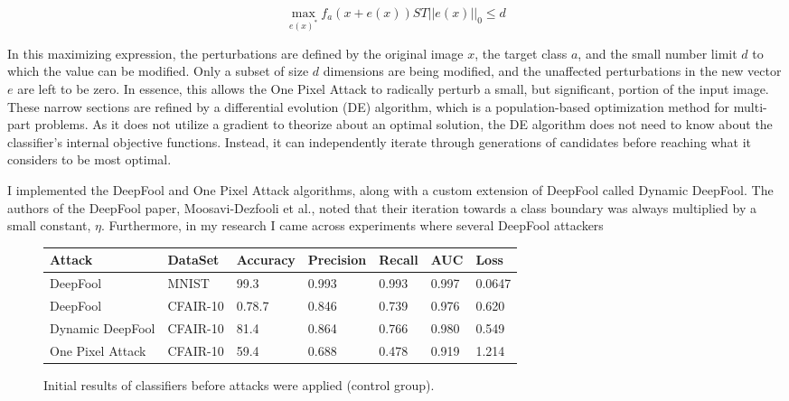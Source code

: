 \documentclass[../article.tex]{subfiles}
\begin{document}
\[\max_{e(x)^*} f_{a}(x + e(x)) ST ||e(x)||_0 \leq d\]

In this maximizing expression, the perturbations are defined by the original image $x$, the target class $a$, and the small number limit $d$ to which the value can be modified. Only a subset of size $d$ dimensions are being modified, and the unaffected perturbations in the new vector $e$ are left to be zero. In essence, this allows the One Pixel Attack to radically perturb a small, but significant, portion of the input image. These narrow sections are refined by a differential evolution (DE) algorithm, which is a population-based optimization method for multi-part problems. As it does not utilize a gradient to theorize about an optimal solution, the DE algorithm does not need to know about the classifier's internal objective functions. Instead, it can independently iterate through generations of candidates before reaching what it considers to be most optimal.

I implemented the DeepFool and One Pixel Attack algorithms, along with a custom extension of DeepFool called Dynamic DeepFool. The authors of the DeepFool paper, Moosavi-Dezfooli et al., noted that their iteration towards a class boundary was always multiplied by a small constant, $\eta$. Furthermore, in my research I came across experiments where several DeepFool attackers

\begin{figure}[H]
	\begin{tabular} {|p{2cm}|p{2cm}||p{2cm}|p{2cm}|p{2cm}|p{2cm}|p{1.5cm}|}
		\hline
		Attack & DataSet  & Accuracy & Precision & Recall & AUC & Loss\\
		\hline
		\hline
		DeepFool & MNIST & 99.3 & 0.993 & 0.993 & 0.997 & 0.0647 \\
		\hline
		DeepFool & CFAIR-10 & 0.78.7 & 0.846 & 0.739 & 0.976 & 0.620 \\
		\hline
		Dynamic DeepFool & CFAIR-10 & 81.4& 0.864 & 0.766 & 0.980 & 0.549 \\
		\hline
		One Pixel Attack & CFAIR-10 & 59.4 & 0.688 & 0.478 & 0.919 & 1.214 \\
		\hline
	\end{tabular}
	\caption{Initial results of classifiers before attacks were applied (control group).}
	\label{fig:ep0.3}
\end{figure}
\end{document}
